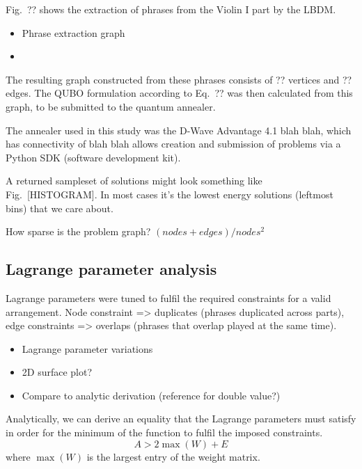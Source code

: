 \documentclass[12pt]{article}
\begin{document}
Fig.\ ?? shows the extraction of phrases from the Violin I part by the LBDM.

\begin{itemize}
    \item Phrase extraction graph
    \item 
\end{itemize}

The resulting graph constructed from these phrases consists of ?? vertices and ?? edges. The QUBO formulation according to Eq.\ ?? was then calculated from this graph, to be submitted to the quantum annealer.

The annealer used in this study was the D-Wave Advantage 4.1 blah blah, which has connectivity of blah blah allows creation and submission of problems via a Python SDK (software development kit).

A returned sampleset of solutions might look something like Fig.\ [HISTOGRAM]. In most cases it's the lowest energy solutions (leftmost bins) that we care about.

How sparse is the problem graph? $(nodes + edges)/nodes^2$

\subsection{Lagrange parameter analysis}

Lagrange parameters were tuned to fulfil the required constraints for a valid arrangement. Node constraint => duplicates (phrases duplicated across parts), edge constraints => overlaps (phrases that overlap played at the same time).

\begin{itemize}
    \item Lagrange parameter variations
    \item 2D surface plot?
    \item Compare to analytic derivation (reference for double value?)
\end{itemize}

Analytically, we can derive an equality that the Lagrange parameters must satisfy in order for the minimum of the function to fulfil the imposed constraints.
\begin{equation}
    A>2\max(W)+E
\end{equation}
where $\max(W)$ is the largest entry of the weight matrix.
\end{document}
